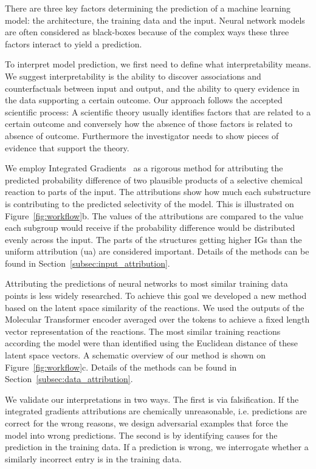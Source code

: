 There are three key factors determining the prediction of a machine learning model: the architecture, the training data and the input. Neural network models are often considered as black-boxes because of the complex ways these three factors interact to yield a prediction. 

To interpret model prediction, we first need to define what interpretability means. We suggest interpretability is the ability to discover associations and counterfactuals between input and output, and the ability to query evidence in the data supporting a certain outcome. Our approach follows the accepted scientific process: A scientific theory usually identifies factors that are related to a certain outcome and conversely how the absence of those factors is related to absence of outcome. Furthermore the investigator needs to show pieces of evidence that support the theory.

We employ Integrated Gradients~\cite{Sundararajan2017} as a rigorous method for attributing the predicted probability difference of two plausible products of a selective chemical reaction to parts of the input. The attributions show how much each substructure is contributing to the predicted selectivity of the model. This is illustrated on Figure~\ref{fig:workflow}b. The values of the attributions are compared to the value each subgroup would receive if the probability difference would be distributed evenly across the input. The parts of the structures getting higher IGs than the uniform attribution (ua) are considered important. Details of the methods can be found in Section~\ref{subsec:input_attribution}. 

Attributing the predictions of neural networks to most similar training data points is less widely researched. To achieve this goal we developed a new method based on the latent space similarity of the reactions. We used the outputs of the Molecular Transformer encoder averaged over the tokens to achieve a fixed length vector representation of the reactions. The most similar training reactions according the model were than identified using the Euclidean distance of these latent space vectors. A schematic overview of our method is shown on Figure~\ref{fig:workflow}c. Details of the methods can be found in Section~\ref{subsec:data_attribution}.

We validate our interpretations in two ways. The first is via falsification. If the integrated gradients attributions are chemically unreasonable, i.e. predictions are correct for the wrong reasons, we design adversarial examples that force the model into wrong predictions. The second is by identifying causes for the prediction in the training data. If a prediction is wrong, we interrogate whether a similarly incorrect entry is in the training data. 

